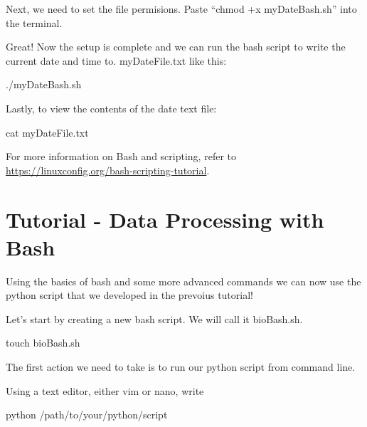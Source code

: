 \documentclass[]{book}
\newenvironment{Shaded}{\begin{snugshade}}{\end{snugshade}}
\newcommand{\FunctionTok}[1]{\textcolor[rgb]{0.00,0.00,0.00}{#1}}
\newcommand{\ExtensionTok}[1]{#1}
\newcommand{\NormalTok}[1]{#1}
\begin{document}
Next, we need to set the file permisions. Paste ``chmod +x
myDateBash.sh'' into the terminal.

Great! Now the setup is complete and we can run the bash script to write
the current date and time to. myDateFile.txt like this:

\begin{Shaded}
\begin{Highlighting}[]
\ExtensionTok{./myDateBash.sh}
\end{Highlighting}
\end{Shaded}

Lastly, to view the contents of the date text file:

\begin{Shaded}
\begin{Highlighting}[]
\FunctionTok{cat}\NormalTok{ myDateFile.txt}
\end{Highlighting}
\end{Shaded}

For more information on Bash and scripting, refer to
\url{https://linuxconfig.org/bash-scripting-tutorial}.

\chapter{Tutorial - Data Processing with
Bash}\label{tutorial---data-processing-with-bash}

Using the basics of bash and some more advanced commands we can now use
the python script that we developed in the prevoius tutorial!

Let's start by creating a new bash script. We will call it bioBash.sh.

\begin{Shaded}
\begin{Highlighting}[]
\FunctionTok{touch}\NormalTok{ bioBash.sh}
\end{Highlighting}
\end{Shaded}

The first action we need to take is to run our python script from
command line.

Using a text editor, either vim or nano, write

\begin{Shaded}
\begin{Highlighting}[]
\ExtensionTok{python}\NormalTok{ /path/to/your/python/script }
\end{Highlighting}
\end{Shaded}
\end{document}
